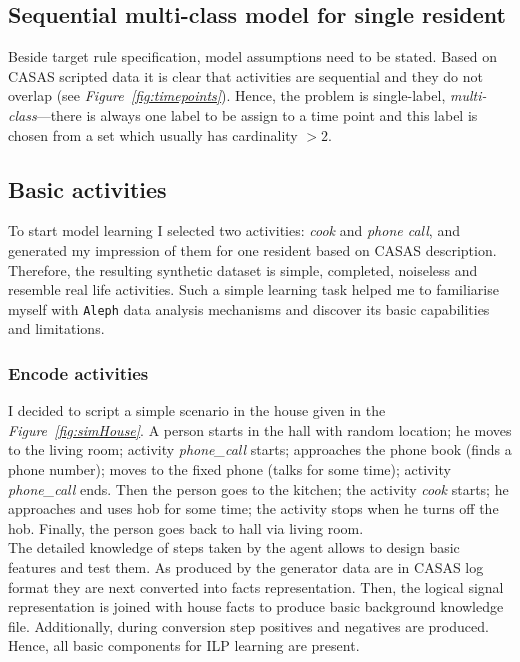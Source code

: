 \documentclass[10pt, a4paper, pdflatex, leqno, twoside, openright]{report}
\begin{document}
    \subsection{Sequential multi-class model for single resident\label{ch:smcm}}
Beside target rule specification, model assumptions need to be stated. Based on CASAS scripted data it is clear that activities are sequential and they do not overlap (see \emph{Figure~\ref{fig:timepoints}}). Hence, the problem is single-label, \emph{multi-class}---there is always one label to be assign to a time point and this label is chosen from a set which usually has cardinality $>2$.

    \subsection{Basic activities\label{sec:basicActibities}}
To start model learning I selected two activities: \emph{cook} and \emph{phone call}, and generated my impression of them for one resident based on CASAS description. Therefore, the resulting synthetic dataset is simple, completed, noiseless and resemble real life activities. Such a simple learning task helped me to familiarise myself with \texttt{Aleph} data analysis mechanisms and discover its basic capabilities and limitations.

      \subsubsection{Encode activities}
I decided to script a simple scenario in the house given in the \emph{Figure~\ref{fig:simHouse}}. A person starts in the hall with random location; he moves to the living room; activity \emph{phone\_call} starts; approaches the phone book (finds a phone number); moves to the fixed phone (talks for some time); activity \emph{phone\_call} ends. Then the person goes to the kitchen; the activity \emph{cook} starts; he approaches and uses hob for some time; the activity stops when he turns off the hob. Finally, the person goes back to hall via living room.\\

The detailed knowledge of steps taken by the agent allows to design basic features and test them. As produced by the generator data are in CASAS log format they are next converted into facts representation. Then, the logical signal representation is joined with house facts to produce basic background knowledge file. Additionally, during conversion step positives and negatives are produced. Hence, all basic components for ILP learning are present.
\end{document}
